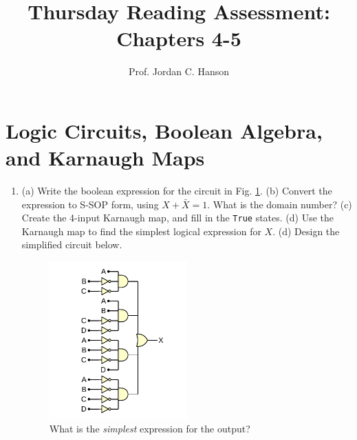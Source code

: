 \documentclass{article}
\begin{document}
\title{Thursday Reading Assessment: Chapters 4-5}
\author{Prof. Jordan C. Hanson}

\maketitle

\section{Logic Circuits, Boolean Algebra, and Karnaugh Maps}

\begin{enumerate}
\item (a) Write the boolean expression for the circuit in Fig. \ref{fig:gates1}.  (b) Convert the expression to S-SOP form, using $X+\bar{X} = 1$.  What is the domain number? (c) Create the 4-input Karnaugh map, and fill in the \verb+True+ states. (d) Use the Karnaugh map to find the simplest logical expression for $X$. (d) Design the simplified circuit below.
\begin{figure}[ht]
\centering
\includegraphics[width=0.5\textwidth]{figures/gateExampleX.pdf}
\caption{\label{fig:gates1} What is the \textit{simplest} expression for the output?}
\end{figure}
\end{enumerate}
\end{document}
